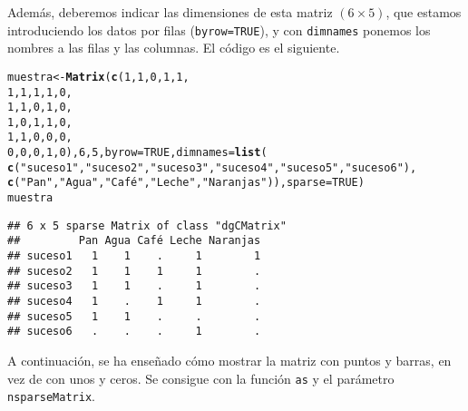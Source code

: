 \documentclass[12pt]{report}\usepackage[]{graphicx}\usepackage[dvipsnames]{xcolor}
\makeatletter
\newcommand{\hlnum}[1]{\textcolor[rgb]{0.686,0.059,0.569}{#1}}%
\newcommand{\hlstr}[1]{\textcolor[rgb]{0.192,0.494,0.8}{#1}}%
\newcommand{\hlstd}[1]{\textcolor[rgb]{0.345,0.345,0.345}{#1}}%
\newcommand{\hlkwb}[1]{\textcolor[rgb]{0.69,0.353,0.396}{#1}}%
\newcommand{\hlkwc}[1]{\textcolor[rgb]{0.333,0.667,0.333}{#1}}%
\newcommand{\hlkwd}[1]{\textcolor[rgb]{0.737,0.353,0.396}{\textbf{#1}}}%
\newenvironment{kframe}{%
 \def\at@end@of@kframe{}%
 \ifinner\ifhmode%
  \def\at@end@of@kframe{\end{minipage}}%
  \begin{minipage}{\columnwidth}%
 \fi\fi%
 \def\FrameCommand##1{\hskip\@totalleftmargin \hskip-\fboxsep
 \colorbox{shadecolor}{##1}\hskip-\fboxsep
     \hskip-\linewidth \hskip-\@totalleftmargin \hskip\columnwidth}%
 \MakeFramed {\advance\hsize-\width
   \@totalleftmargin\z@ \linewidth\hsize
   \@setminipage}}%
 {\par\unskip\endMakeFramed%
 \at@end@of@kframe}
\newenvironment{knitrout}{}{} %
\makeatother
\begin{document}
				Además, deberemos indicar las dimensiones de esta matriz $(6\times5)$, que estamos introduciendo los datos por filas (\texttt{byrow=TRUE}), y con \texttt{dimnames} ponemos los nombres a las filas y las columnas. El código es el siguiente. 
				
\begin{knitrout}
\color{fgcolor}\begin{kframe}
\begin{alltt}
\hlstd{muestra} \hlkwb{<-} \hlkwd{Matrix}\hlstd{(}\hlkwd{c}\hlstd{(}\hlnum{1}\hlstd{,} \hlnum{1}\hlstd{,} \hlnum{0}\hlstd{,} \hlnum{1}\hlstd{,} \hlnum{1}\hlstd{,}
\hlnum{1}\hlstd{,} \hlnum{1}\hlstd{,} \hlnum{1}\hlstd{,} \hlnum{1}\hlstd{,} \hlnum{0}\hlstd{,}
\hlnum{1}\hlstd{,} \hlnum{1}\hlstd{,} \hlnum{0}\hlstd{,} \hlnum{1}\hlstd{,} \hlnum{0}\hlstd{,}
\hlnum{1}\hlstd{,} \hlnum{0}\hlstd{,} \hlnum{1}\hlstd{,} \hlnum{1}\hlstd{,} \hlnum{0}\hlstd{,}
\hlnum{1}\hlstd{,} \hlnum{1}\hlstd{,} \hlnum{0}\hlstd{,} \hlnum{0}\hlstd{,} \hlnum{0}\hlstd{,}
\hlnum{0}\hlstd{,} \hlnum{0}\hlstd{,} \hlnum{0}\hlstd{,} \hlnum{1}\hlstd{,} \hlnum{0}\hlstd{),} \hlnum{6}\hlstd{,} \hlnum{5}\hlstd{,} \hlkwc{byrow} \hlstd{=} \hlnum{TRUE}\hlstd{,} \hlkwc{dimnames} \hlstd{=} \hlkwd{list}\hlstd{(}
\hlkwd{c}\hlstd{(}\hlstr{"suceso1"}\hlstd{,} \hlstr{"suceso2"}\hlstd{,} \hlstr{"suceso3"}\hlstd{,} \hlstr{"suceso4"}\hlstd{,} \hlstr{"suceso5"}\hlstd{,} \hlstr{"suceso6"}\hlstd{),}
\hlkwd{c}\hlstd{(}\hlstr{"Pan"}\hlstd{,} \hlstr{"Agua"}\hlstd{,} \hlstr{"Café"}\hlstd{,} \hlstr{"Leche"}\hlstd{,} \hlstr{"Naranjas"}\hlstd{)),} \hlkwc{sparse}\hlstd{=}\hlnum{TRUE}\hlstd{)}
\hlstd{muestra}
\end{alltt}
\begin{verbatim}
## 6 x 5 sparse Matrix of class "dgCMatrix"
##         Pan Agua Café Leche Naranjas
## suceso1   1    1    .     1        1
## suceso2   1    1    1     1        .
## suceso3   1    1    .     1        .
## suceso4   1    .    1     1        .
## suceso5   1    1    .     .        .
## suceso6   .    .    .     1        .
\end{verbatim}
\end{kframe}
\end{knitrout}
				
				A continuación, se ha enseñado cómo mostrar la matriz con puntos y barras, en vez de con unos y ceros. Se consigue con la función \texttt{as} y el parámetro \texttt{nsparseMatrix}. 
				
\end{document}
